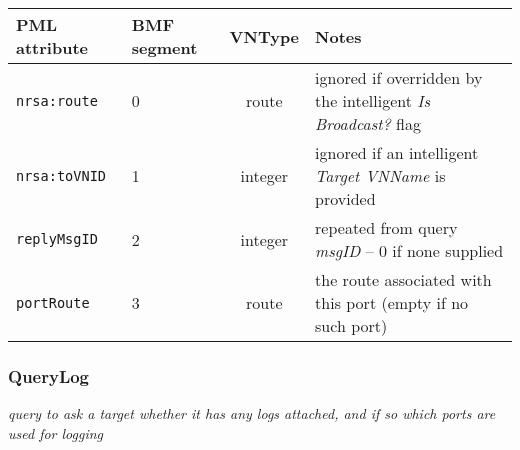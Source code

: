 \documentclass[pdftex,a4paper]{article}
\newcommand{\XMLfont}[1]{{\tt \small #1}}
\begin{document}
\begin{table}[!h]
  \begin{center}
    \label{tab:ReplyPort}
    \begin{tabular}{|l|p{13mm}|c|p{60mm}|}
      \hline

      \textbf{PML attribute} & \textbf{BMF segment} & \textbf{VNType}
      & \textbf{Notes} \\\hline

      \XMLfont{nrsa:route} & 0 & route & ignored if overridden by the
      intelligent {\em Is Broadcast?} flag \\ \hline

      \XMLfont{nrsa:toVNID} & 1 & integer & ignored if an intelligent {\em
      Target VNName} is provided \\\hline

      \XMLfont{replyMsgID} & 2 & integer & repeated from query {\em
      msgID} -- 0 if none supplied \\\hline

      \XMLfont{portRoute} & 3 & route & the route associated with this port
      (empty if no such port) \\\hline

    \end{tabular}
  \end{center}
\end{table}
\clearpage

\subsubsection{QueryLog}
{\em query to ask a target whether it has any logs attached, and if so
which ports are used for logging}
\end{document}
